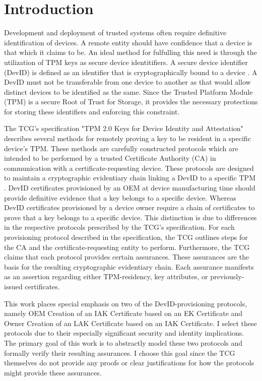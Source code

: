 \chapter{Introduction}




Development and deployment of trusted systems often require definitive identification of devices. A remote entity should have confidence that a device is that which it claims to be. An ideal method for fulfulling this need is through the utilization of TPM keys as secure device identitifiers. A secure device identifier (DevID) is defined as an identifier that is cryptographically bound to a device \cite{DevIDSpec-IEEE}. 
A DevID must not be transferable from one device to another as that would allow distinct devices to be identified as the same. 
Since the Trusted Platform Module (TPM) is a secure Root of Trust for Storage, it provides the necessary protections for storing these identifiers and enforcing this constraint. 

The TCG's specification "TPM 2.0 Keys for Device Identity and Attestation" describes several methods for remotely proving a key to be resident in a specific device's TPM. These methods are carefully constructed protocols which are intended to be performed by a trusted Certificate Authority (CA) in communication with a certificate-requesting device. These protocols are designed to maintain a cryptographic evidentiary chain linking a DevID to a specific TPM \cite{DevIDSpec-TCG}. 
DevID certificates provisioned by an OEM at device manufacturing time should provide definitive evidence that a key belongs to a specific device. Whereas DevID certificates provisioned by a device owner require a chain of certificates to prove that a key belongs to a specific device. This distinction is due to differences in the respective protocols prescribed by the TCG's specification. 
For each provisioning protocol described in the specification, the TCG outlines steps for the CA and the certificate-requesting entity to perform. Furthermore, the TCG claims that each protocol provides certain assurances. These assurances are the basis for the resulting cryptographic evidentiary chain.
Each assurance manifests as an assertion regarding either TPM-residency, key attributes, or previously-issued certificates.

This work places special emphasis on two of the DevID-provisioning protocols, namely OEM Creation of an IAK Certificate based on an EK Certificate and Owner Creation of an LAK Certificate based on an IAK Certificate. I select these protocols due to their especially significant security and identity implications. The primary goal of this work is to abstractly model these two protocols and formally verify their resulting assurances. I choose this goal since the TCG themselves do not provide any proofs or clear justifications for how the protocols might provide these assurances. 

